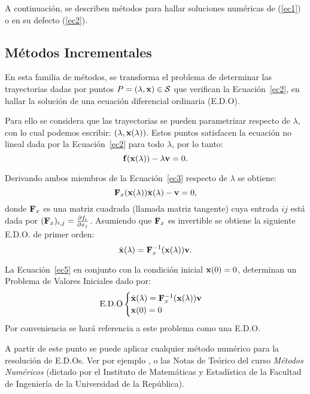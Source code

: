 A continuación, se describen métodos para hallar soluciones numéricas de (\ref{ec1}) o en su defecto (\ref{ec2}).

\subsection{Métodos Incrementales}\label{Increm}

En esta familia de métodos, se transforma el problema de determinar las trayectorias dadas por puntos $P=(\lambda,{\bf x})\in\mathcal{S}$ que verifican la Ecuación~\eqref{ec2}, en hallar la solución de una ecuación diferencial ordinaria (E.D.O).

Para ello se considera que las trayectorias se pueden parametrizar respecto de $\lambda$, con lo cual podemos escribir: $(\lambda,{\bf x}(\lambda))$. Estos puntos satisfacen la ecuación no lineal dada por la Ecuación~\eqref{ec2} para todo $\lambda$, por lo tanto:
%
\begin{equation}\label{ec3}
{\bf f}({\bf x}(\lambda))-\lambda {\bf v}=0.
\end{equation}

Derivando ambos miembros de la Ecuación~\eqref{ec3} respecto de $\lambda$ se obtiene:
%
\begin{equation}\label{ec4}
{\bf F}_x({\bf x}(\lambda))\dot{{\bf x}}(\lambda)-{\bf v}=0,
\end{equation}
%
donde ${\bf F}_x$ es una matriz cuadrada (llamada matriz tangente) cuya entrada $ij$ está dada por $({\bf F}_x)_{i,j}=\frac{\partial f_i}{\partial x_j}$. %
%
Asumiendo que ${\bf F}_x$ es invertible se obtiene la siguiente E.D.O. de primer orden:
%
\begin{equation}\label{ec5}
\dot{{\bf x}}(\lambda)={\bf F}_x^{-1}({\bf x}(\lambda)){\bf v}.
\end{equation}

La Ecuación~\eqref{ec5} en conjunto con la condición inicial ${\bf x}(0)=0$, determinan un Problema de Valores Iniciales dado por:
%
\begin{equation}\label{EDO}
\text{E.D.O}
	\begin{cases} 
		\dot{{\bf x}}(\lambda)={\bf F}_x^{-1}({\bf x}(\lambda)){\bf v} \\
		{\bf x}(0)=0
	\end{cases}
\end{equation}
%
Por conveniencia se hará referencia a este problema como una E.D.O. %

A partir de este punto se puede aplicar cualquier método numérico para la resolución de E.D.Os. %
%
Ver por ejemplo \citep{kahaner1989numerical}, \citep{butcher2004numerical} o las Notas de Teórico del curso \textit{Métodos Numéricos} (dictado por el Instituto de Matemáticas y Estadística de la Facultad de Ingeniería de la Universidad de la República).

